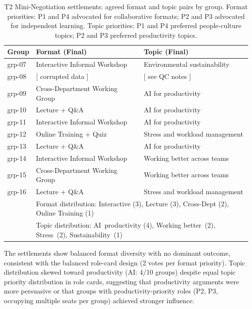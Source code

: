 \documentclass[11pt,a4paper]{article}
\begin{document}
\begin{table}[htb]
  \centering
  \caption{T2 Mini-Negotiation settlements: agreed format and topic pairs by group.
    Format priorities: P1 and P4 advocated for collaborative formats; P2 and P3 
    advocated for independent learning. Topic priorities: P1 and P4 preferred 
    people-culture topics; P2 and P3 preferred productivity topics.}
  \label{tab:t2-settlements}
  \small
  \begin{tabular}{llp{8cm}}
    \toprule
    Group & Format (Final) & Topic (Final) \\
    \midrule
    grp-07 & Interactive Informal Workshop & Environmental sustainability \\
    grp-08 & {[} corrupted data {]} & {[} see QC notes {]} \\
    grp-09 & Cross-Department Working Group & AI for productivity \\
    grp-10 & Lecture + Q\&A & AI for productivity \\
    grp-11 & Interactive Informal Workshop & AI for productivity \\
    grp-12 & Online Training + Quiz & Stress and workload management \\
    grp-13 & Lecture + Q\&A & AI for productivity \\
    grp-14 & Interactive Informal Workshop & Working better across teams \\
    grp-15 & Cross-Department Working Group & Working better across teams \\
    grp-16 & Lecture + Q\&A & Stress and workload management \\
    \midrule
    & \multicolumn{2}{l}{Format distribution: Interactive (3), Lecture (3), Cross-Dept (2), Online Training (1)} \\
    & \multicolumn{2}{l}{Topic distribution: AI~productivity (4), Working better~(2), Stress~(2), Sustainability~(1)} \\
    \bottomrule
  \end{tabular}
\end{table}

The settlements show balanced format diversity with no dominant outcome, 
consistent with the balanced role-card design (2 votes per format priority). 
Topic distribution skewed toward productivity (AI: 4/10 groups) despite equal 
topic priority distribution in role cards, suggesting that productivity arguments 
were more persuasive or that groups with productivity-priority roles (P2, P3, 
occupying multiple seats per group) achieved stronger influence.
\end{document}
